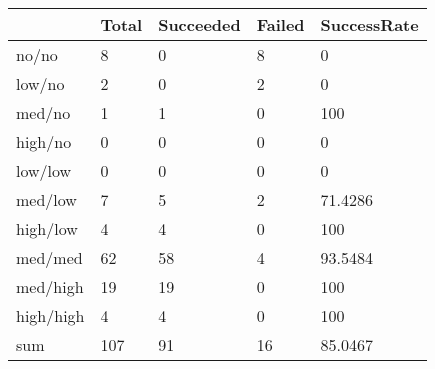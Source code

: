 \begin{tabular}{lllll}
& Total & Succeeded & Failed & SuccessRate \\ 
\hline 
no/no & 8 & 0 & 8 & 0 \\ 
low/no & 2 & 0 & 2 & 0 \\ 
med/no & 1 & 1 & 0 & 100 \\ 
high/no & 0 & 0 & 0 & 0 \\ 
low/low & 0 & 0 & 0 & 0 \\ 
med/low & 7 & 5 & 2 & 71.4286 \\ 
high/low & 4 & 4 & 0 & 100 \\ 
med/med & 62 & 58 & 4 & 93.5484 \\ 
med/high & 19 & 19 & 0 & 100 \\ 
high/high & 4 & 4 & 0 & 100 \\ 
sum & 107 & 91 & 16 & 85.0467 \\ 
\hline 
\end{tabular}